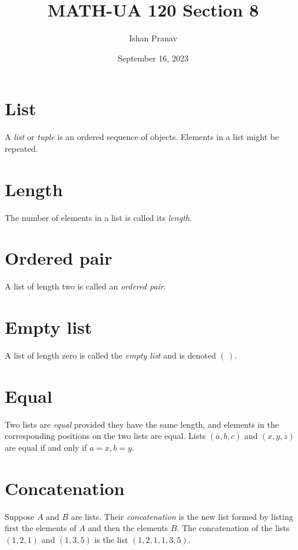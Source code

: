 \documentclass[12pt]{article}
\title{MATH-UA 120 Section 8}
\author{Ishan Pranav}
\date{September 16, 2023}
\begin{document}
\maketitle
\section*{List}
A \textit{list} or \textit{tuple} is an ordered sequence of objects. Elements in a list might be repeated.
\section*{Length}
The number of elements in a list is called its \textit{length}.
\section*{Ordered pair}
A list of length two is called an \textit{ordered pair}.
\section*{Empty list}
A list of length zero is called the \textit{empty list} and is denoted $(\,)$.
\section*{Equal}
Two lists are \textit{equal} provided they have the same length, and elements in the corresponding positions on the two lists are equal. Lists $(a,b,c)$ and $(x,y,z)$ are equal if and only if $a=x,b=y$.
\section*{Concatenation}
Suppose $A$ and $B$ are lists. Their \textit{concatenation} is the new list formed by listing first the elements of $A$ and then the elements $B$. The concatenation of the lists $(1,2,1)$ and $(1,3,5)$ is the list $(1,2,1,1,3,5)$.
\end{document}
